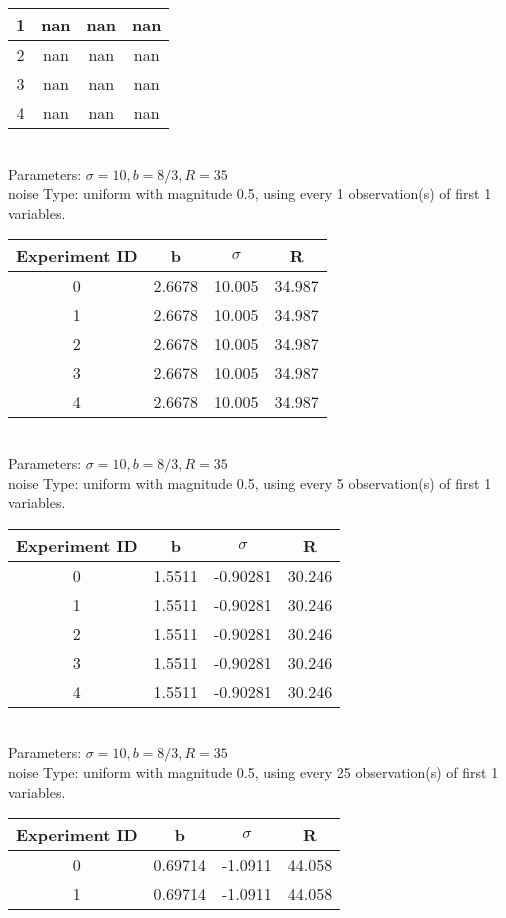 \begin{multicols}{3}
\begin{tabular}{cccc}
 1 & nan & nan & nan\\ \hline 
 2 & nan & nan & nan\\ \hline 
 3 & nan & nan & nan\\ \hline 
 4 & nan & nan & nan\\ \hline 
 \end{tabular}\\
Parameters: $\sigma=10, b=8/3, R=35$\\
noise Type: uniform with magnitude 0.5, using every 1 observation(s) of first 1 variables.\\
\begin{tabular}{cccc}
\hline Experiment ID & b & $\sigma$ & R \\ \hline 
0 & 2.6678 & 10.005 & 34.987\\ \hline 
 1 & 2.6678 & 10.005 & 34.987\\ \hline 
 2 & 2.6678 & 10.005 & 34.987\\ \hline 
 3 & 2.6678 & 10.005 & 34.987\\ \hline 
 4 & 2.6678 & 10.005 & 34.987\\ \hline 
 \end{tabular}\\
Parameters: $\sigma=10, b=8/3, R=35$\\
noise Type: uniform with magnitude 0.5, using every 5 observation(s) of first 1 variables.\\
\begin{tabular}{cccc}
\hline Experiment ID & b & $\sigma$ & R \\ \hline 
0 & 1.5511 & -0.90281 & 30.246\\ \hline 
 1 & 1.5511 & -0.90281 & 30.246\\ \hline 
 2 & 1.5511 & -0.90281 & 30.246\\ \hline 
 3 & 1.5511 & -0.90281 & 30.246\\ \hline 
 4 & 1.5511 & -0.90281 & 30.246\\ \hline 
 \end{tabular}\\
Parameters: $\sigma=10, b=8/3, R=35$\\
noise Type: uniform with magnitude 0.5, using every 25 observation(s) of first 1 variables.\\
\begin{tabular}{cccc}
\hline Experiment ID & b & $\sigma$ & R \\ \hline 
0 & 0.69714 & -1.0911 & 44.058\\ \hline 
 1 & 0.69714 & -1.0911 & 44.058\\ \hline 

\end{tabular}
\end{multicols}
